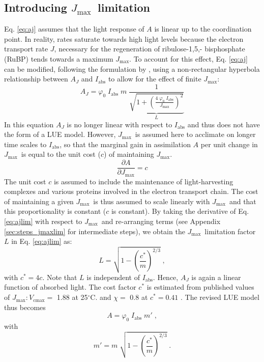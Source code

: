\documentclass{myreport}
\newcommand{\vcmax}{$V_{\text{cmax}}$}
\newcommand{\jmax}{$J_{\text{max}}$}
\begin{document}
\subsection{Introducing \jmax\ limitation}
\label{sec:jmax}
Eq. \ref{eq:aj} assumes that the light response of $A$ is linear up to the coordination point. In reality, rates saturate towards high light levels because the electron transport rate $J$, necessary for the regeneration of ribulose-1,5,- bisphosphate (RuBP) tends towards a maximum \jmax . To account for this effect, Eq. \ref{eq:aj} can be modified, following the formulation by \citet{smith37}, using a non-rectangular hyperbola relationship between $A_J$ and $I_{\mathrm{abs}}$ to allow for the effect of finite $J_{\mathrm{max}}$:
\begin{equation}
\label{eq:ajlim}
    A_J = \varphi_0 \; I_{\mathrm{abs}} \; m \; \underbrace{ \frac{1}{\sqrt{1+ \left( \frac{4\;\varphi_0\;I_{\mathrm{abs}}}{J_{\mathrm{max}}} \right)^{2}}} }_{L}
\end{equation}
In this equation $A_J$ is no longer linear with respect to $I_{\mathrm{abs}}$ and thus does not have the form of a LUE model. However, \jmax\ is assumed here to acclimate on longer time scales to $I_{\mathrm{abs}}$, so that the marginal gain in assimilation $A$ per unit change in \jmax\ is equal to the unit cost ($c$) of maintaining \jmax .
\begin{equation}
\label{eq:jmaxpartial}
    \frac{\partial A}{\partial J_{\mathrm{max}}} = c 
\end{equation}
The unit cost $c$ is assumed to include the maintenance of light-harvesting complexes and various proteins involved in the electron transport chain. The cost of maintaining a given \jmax\ is thus assumed to scale linearly with \jmax\ and that this proportionality is constant ($c$ is constant). By taking the derivative of Eq. \ref{eq:ajlim} with respect to \jmax\ and re-arranging terms (see Appendix \ref{sec:steps_jmaxlim} for intermediate steps), we obtain the \jmax\ limitation factor $L$ in Eq. \ref{eq:ajlim} as:
\begin{equation}
\label{eq:factor_jmaxlim}
    L = \sqrt{ 1 - \left( \frac{c^\ast}{m} \right)^{2/3} }\;,
\end{equation}
with $c^\ast = 4c$. Note that $L$ is independent of $I_\text{abs}$. Hence, $A_J$ is again a linear function of absorbed light. The cost factor $c^\ast$ is estimated from published values of \jmax $:$\vcmax $=$ 1.88 at 25$^\circ$C. \citep{kattge07} and $\chi =$ 0.8 \citep{lloyd94} at $c^\ast = 0.41$ \citep{wang17natpl}. The revised LUE model thus becomes
\begin{equation}
\label{eq:ajlim4}
    A = \varphi_0 \; I_{\mathrm{abs}} \; m' \;,
\end{equation}
with
\begin{equation}
\label{eq:mprime}
    m' = m \; \sqrt{1 - \left( \frac{c^\ast}{m} \right)^{2/3} } \;.
\end{equation}
\end{document}
